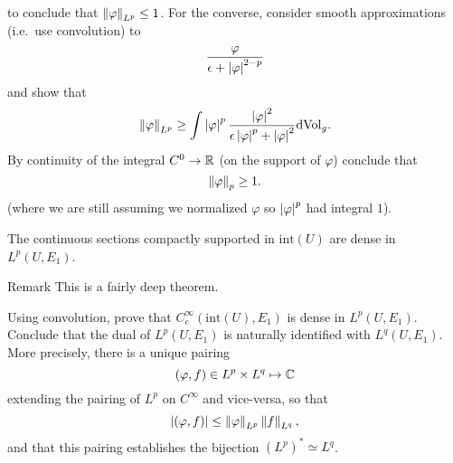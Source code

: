 \documentclass{amsart}
\begin{document}
\begin{defn}
\begin{xca}
\begin{equation*}
    \end{equation*}
    to conclude that $\left\lVert\varphi\right\rVert_{L^{p}}\le 1$. For the converse, consider smooth approximations (i.e.\ use convolution) to 
    \begin{equation*}
      \frac{\varphi}{\epsilon+\left|\varphi\right|^{2-p}}
    \end{equation*}
    and show that
    \begin{equation*}
      \left\lVert\varphi\right\rVert_{L^{p}}\ge \int\left|\varphi\right|^{p}\frac{\left|\varphi\right|^{2}}{\epsilon\left|\varphi\right|^{p}+\left|\varphi\right|^{2}}\mathrm{dVol}_{g}.
    \end{equation*}
    By continuity of the integral $C^{0}\to \mathbb{R}$ (on the support of $\varphi$) conclude that
    \begin{equation*}
      \left\lVert\varphi\right\rVert_{p}\ge 1.
    \end{equation*}
    (where we are still assuming we normalized $\varphi$ so $\left|\varphi\right|^{p}$ had integral $1$).
  \end{xca}
  \begin{thm}
    The continuous sections compactly supported in $\text{int}(U)$ are dense in $L^{p}(U,E_{1})$. 
  \end{thm}
  \begin{clear}{Remark}
    This is a fairly deep theorem.
  \end{clear}
  \begin{cor}
    Using convolution, prove that $C^{\infty}_{c}(\text{int}(U),E_{1})$ is dense in $L^{p}(U,E_{1})$. Conclude that the dual of $L^{p}(U,E_{1})$ is naturally identified with $L^{q}(U,E_{1})$. More precisely, there is a unique pairing
    \begin{equation*}
      (\varphi,f)\in L^{p}\times L^{q}\mapsto \mathbb{C}
    \end{equation*}
    extending the pairing of $L^{p}$ on $C^{\infty}$ and vice-versa, so that
    \begin{equation*}
      \left|(\varphi,f)\right|\le \left\lVert\varphi\right\rVert_{L^{p}}\left\lVert f\right\rVert_{L^{q}},
    \end{equation*}
    and that this pairing establishes the bijection $(L^{p})^{*}\simeq L^{q}$.
  \end{cor}  
\end{defn}
\end{document}
